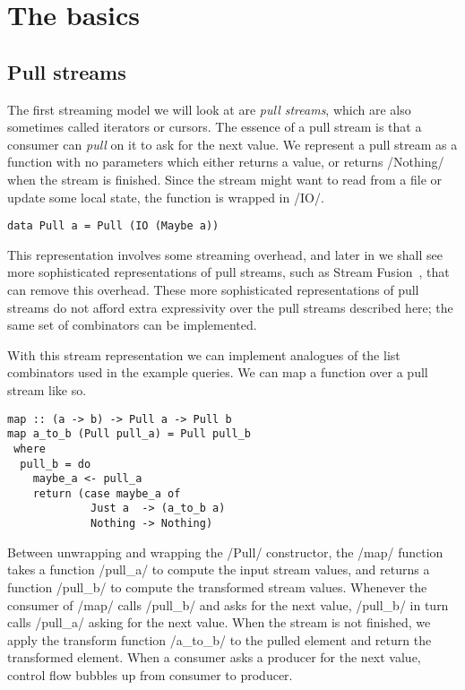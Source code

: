 \section{The basics}

\subsection{Pull streams}

The first streaming model we will look at are \emph{pull streams}, which are also sometimes called iterators or cursors.
The essence of a pull stream is that a consumer can \emph{pull} on it to ask for the next value.
We represent a pull stream as a function with no parameters which either returns a value, or returns \Hs/Nothing/ when the stream is finished.
Since the stream might want to read from a file or update some local state, the function is wrapped in \Hs/IO/.

\begin{lstlisting}
data Pull a = Pull (IO (Maybe a))
\end{lstlisting}

This representation involves some streaming overhead, and later in  we shall see more sophisticated representations of pull streams, such as Stream Fusion~\cite{coutts2007stream}, that can remove this overhead.
These more sophisticated representations of pull streams do not afford extra expressivity over the pull streams described here; the same set of combinators can be implemented.

With this stream representation we can implement analogues of the list combinators used in the example queries.
We can map a function over a pull stream like so.

\begin{lstlisting}
map :: (a -> b) -> Pull a -> Pull b
map a_to_b (Pull pull_a) = Pull pull_b
 where
  pull_b = do
    maybe_a <- pull_a
    return (case maybe_a of
             Just a  -> (a_to_b a)
             Nothing -> Nothing)
\end{lstlisting}

Between unwrapping and wrapping the \Hs/Pull/ constructor, the \Hs/map/ function takes a function \Hs/pull_a/ to compute the input stream values, and returns a function \Hs/pull_b/ to compute the transformed stream values.
Whenever the consumer of \Hs/map/ calls \Hs/pull_b/ and asks for the next value, \Hs/pull_b/ in turn calls \Hs/pull_a/ asking for the next value.
When the stream is not finished, we apply the transform function \Hs/a_to_b/ to the pulled element and return the transformed element.
When a consumer asks a producer for the next value, control flow bubbles up from consumer to producer.

